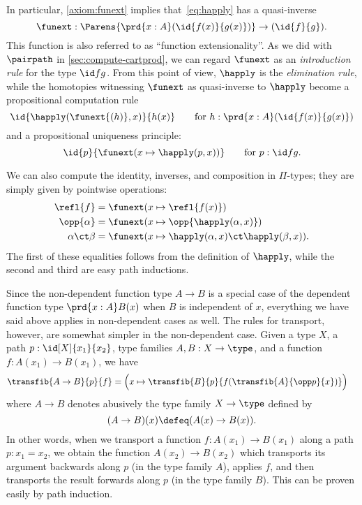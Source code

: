 In particular, \cref{axiom:funext} implies that~\eqref{eq:happly} has a quasi-inverse
\[
\funext : \Parens{\prd{x:A} (\id{f(x)}{g(x)})} \to {(\id{f}{g})}.
\]
This function is also referred to as ``function extensionality''.
As we did with $\pairpath$ in \cref{sec:compute-cartprod}, we can regard $\funext$ as an \emph{introduction rule} for the type $\id f g$.
From this point of view, $\happly$ is the \emph{elimination rule}, while the homotopies witnessing $\funext$ as quasi-inverse to $\happly$ become a propositional computation rule
\[
\id{\happly({\funext{(h)}},x)}{h(x)} \qquad\text{for }h:\prd{x:A} (\id{f(x)}{g(x)})
\]
and a propositional uniqueness principle:
\[
\id{p}{\funext (x \mapsto \happly(p,{x}))} \qquad\text{for } p: \id f g.
\]

We can also compute the identity, inverses, and composition in $\Pi$-types; they are simply given by pointwise operations:
\begin{align*}
\refl{f} &= \funext(x \mapsto \refl{f(x)}) \\
\opp{\alpha} &= \funext (x \mapsto \opp{\happly (\alpha,x)})  \\
{\alpha} \ct \beta &= \funext (x \mapsto {\happly({\alpha},x) \ct \happly({\beta},x)}).
\end{align*}
The first of these equalities follows from the definition of $\happly$, while the second and third are easy path inductions.

Since the non-dependent function type $A\to B$ is a special case of the dependent function type $\prd{x:A} B(x)$ when $B$ is independent of $x$, everything we have said above applies in non-dependent cases as well.
%
The rules for transport, however, are somewhat simpler in the non-dependent case.
Given a type $X$, a path $p:\id[X]{x_1}{x_2}$, type families $A,B:X\to \type$, and a function $f : A(x_1) \to B(x_1)$,  we have
\begin{align}\label{eq:transport-arrow}
  \transfib{A\to B}{p}{f} &=
  \Big(x \mapsto \transfib{B}{p}{f(\transfib{A}{\opp p}{x})}\Big)
\end{align}
where $A\to B$ denotes abusively the type family $X\to \type$ defined by
\[(A\to B)(x) \defeq (A(x)\to B(x)).\]
In other words, when we transport a function $f:A(x_1)\to B(x_1)$ along a path $p:x_1=x_2$, we obtain the function $A(x_2)\to B(x_2)$ which transports its argument backwards along $p$ (in the type family $A$), applies $f$, and then transports the result forwards along $p$ (in the type family $B$).
This can be proven easily by path induction.

